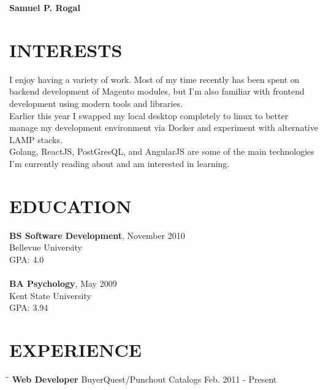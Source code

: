 \documentclass{res}
\begin{document}
 

\begin{center}
	\bf Samuel P. Rogal
\end{center}

\begin{flushleft}
 	
\end{flushleft}
                                  
\begin{resume}

\section{INTERESTS}          
    I enjoy having a variety of work. Most of my time recently has been spent on backend
    development of Magento modules, but I'm also familiar with frontend development using
    modern tools and libraries. \\
    Earlier this year I swapped my local desktop completely to linux to better
    manage my development environment via Docker and experiment with alternative
    LAMP stacks. \\
    Golang, ReactJS, PostGresQL, and AngularJS are some of the main technologies I'm currently
    reading about and am interested in learning.
    
 
\section{EDUCATION}
    \textbf{BS Software Development}, November 2010 \\
    Bellevue University \\    
    GPA: 4.0 \\  
    \\
    \textbf{BA Psychology}, May 2009 \\
    Kent State University \\    
    GPA: 3.94
 
\section{EXPERIENCE}
   \vspace{-0.1in}	
   
   \begin{tabbing}
   		\hspace{2.0in}\= \hspace{2.7in}\= \kill %
    	\textbf{Web Developer} \>BuyerQuest/Punchout Catalogs     \>Feb. 2011 - Present\\
   \end{tabbing}\vspace{-20pt}      %
   

\end{resume}
\end{document}
